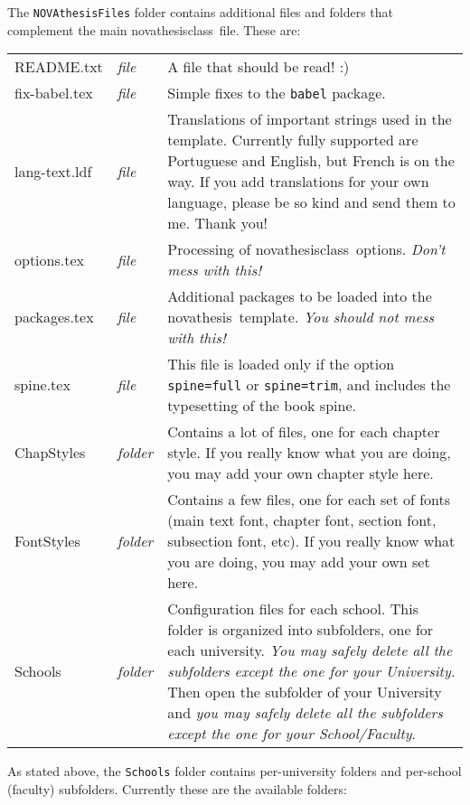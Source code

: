 The \texttt{NOVAthesisFiles} folder contains additional files and folders that complement the main \gls{novathesisclass}\ file.  These are:

\noindent
\bgroup
{}
\begin{tabularx}{\linewidth}{>{\ttfamily}l>{\itshape}l>{\upshape}X}
  README.txt    & file   &
  A file that should be read!  :)
  \\
  fix-babel.tex & file   &
  Simple fixes to the \texttt{babel} package.
  \\
  lang-text.ldf & file   &
  Translations of important strings used in the template.  Currently fully supported are Portuguese and English, but French is on the way.  If you add translations for your own language, please be so kind and send them to me. Thank you!
  \\
  options.tex   & file   &
  Processing of \gls{novathesisclass}\ options.  \emph{Don't mess with this!}
  \\
  packages.tex  & file   &
  Additional packages to be loaded into the \gls{novathesis}\ template. \emph{You should not mess with this!}
  \\
  spine.tex     & file   &
  This file is loaded only if the option \texttt{spine=full} or \texttt{spine=trim}, and includes the typesetting of the book spine.
  \\
  ChapStyles    & folder &
  Contains a lot of files, one for each chapter style.  If you really know what you are doing, you may add your own chapter style here.
  \\
  FontStyles    & folder &
  Contains a few files, one for each set of fonts (main text font, chapter font, section font, subsection font, etc).  If you really know what you are doing, you may add your own set here.
  \\
  Schools       & folder &
  Configuration files for each school.  This folder is organized into subfolders, one for each university.  \emph{You may safely delete all the subfolders except the one for your University.}  Then open the subfolder of your University and \emph{you may safely delete all the subfolders except the one for your School/Faculty}.
  \\
\end{tabularx}
\egroup

As stated above, the \texttt{Schools} folder contains per-university folders and per-school (faculty) subfolders.  Currently these are the available folders:


